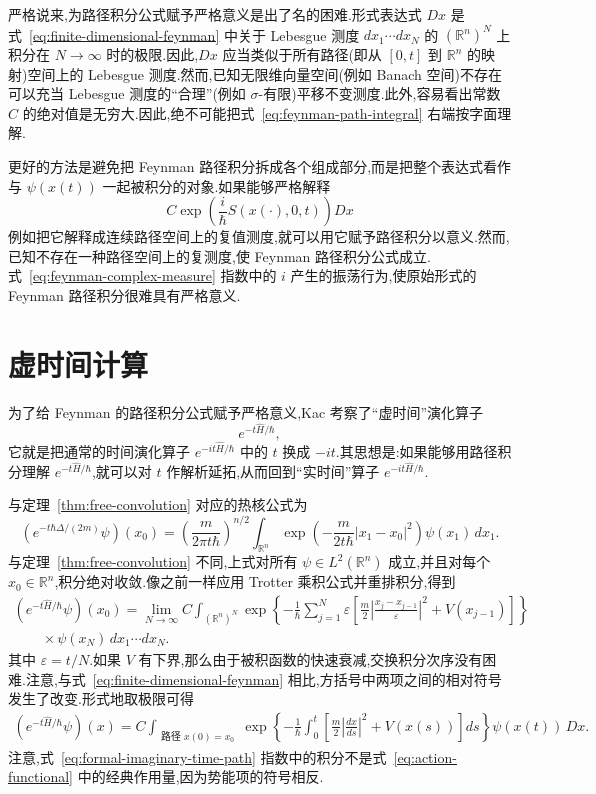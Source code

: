 严格说来,为路径积分公式赋予严格意义是出了名的困难.形式表达式 $Dx$ 是式~\eqref{eq:finite-dimensional-feynman} 中关于 Lebesgue 测度 $dx_1\cdots dx_N$ 的 $(\mathbb R^n)^N$ 上积分在 $N\to\infty$ 时的极限.因此,$Dx$ 应当类似于所有路径(即从 $[0,t]$ 到 $\mathbb R^n$ 的映射)空间上的 Lebesgue 测度.然而,已知无限维向量空间(例如 Banach 空间)不存在可以充当 Lebesgue 测度的“合理”(例如 $\sigma$-有限)平移不变测度.此外,容易看出常数 $C$ 的绝对值是无穷大.因此,绝不可能把式~\eqref{eq:feynman-path-integral} 右端按字面理解.

更好的方法是避免把 Feynman 路径积分拆成各个组成部分,而是把整个表达式看作与 $\psi(x(t))$ 一起被积分的对象.如果能够严格解释
\[
 C\exp\left(\frac{i}{\hbar}S(x(\cdot),0,t)\right)Dx\label{eq:feynman-complex-measure}
\]
例如把它解释成连续路径空间上的复值测度,就可以用它赋予路径积分以意义.然而,已知不存在一种路径空间上的复测度,使 Feynman 路径积分公式成立.式~\eqref{eq:feynman-complex-measure} 指数中的 $i$ 产生的振荡行为,使原始形式的 Feynman 路径积分很难具有严格意义.

\section{虚时间计算}
\label{sec:imaginary-time}

为了给 Feynman 的路径积分公式赋予严格意义,Kac 考察了“虚时间”演化算子
\[
 e^{-t\widehat H/\hbar},
\]
它就是把通常的时间演化算子 $e^{-it\widehat H/\hbar}$ 中的 $t$ 换成 $-it$.其思想是:如果能够用路径积分理解 $e^{-t\widehat H/\hbar}$,就可以对 $t$ 作解析延拓,从而回到“实时间”算子 $e^{-it\widehat H/\hbar}$.

与定理~\ref{thm:free-convolution} 对应的热核公式为
\[
 (e^{-t\hbar\Delta/(2m)}\psi)(x_0)
 =\left(\frac{m}{2\pi t\hbar}\right)^{n/2}
 \int_{\mathbb R^n}
 \exp\left(-\frac{m}{2t\hbar}|x_1-x_0|^2\right)
 \psi(x_1)\,dx_1.\label{eq:heat-kernel-free}
\]
与定理~\ref{thm:free-convolution} 不同,上式对所有 $\psi\in L^2(\mathbb R^n)$ 成立,并且对每个 $x_0\in\mathbb R^n$,积分绝对收敛.像之前一样应用 Trotter 乘积公式并重排积分,得到
\[
\begin{aligned}
 (e^{-t\widehat H/\hbar}\psi)(x_0)
 =\lim_{N\to\infty}C\int_{(\mathbb R^n)^N}
 \exp\left\{-\frac1\hbar\sum_{j=1}^N\varepsilon
 \left[\frac m2\left|\frac{x_j-x_{j-1}}{\varepsilon}\right|^2
 +V(x_{j-1})\right]\right\}\\
 \qquad\times\psi(x_N)\,dx_1\cdots dx_N.\label{eq:finite-dimensional-imaginary-time}
\end{aligned}
\]
其中 $\varepsilon=t/N$.如果 $V$ 有下界,那么由于被积函数的快速衰减,交换积分次序没有困难.注意,与式~\eqref{eq:finite-dimensional-feynman} 相比,方括号中两项之间的相对符号发生了改变.形式地取极限可得
\[
\begin{aligned}
 (e^{-t\widehat H/\hbar}\psi)(x)
 =C\int_{\substack{\text{路径 }x(0)=x_0}}
 \exp\left\{-\frac1\hbar\int_0^t
 \left[\frac m2\left|\frac{dx}{ds}\right|^2+V(x(s))\right]ds\right\}
 \psi(x(t))\,Dx.\label{eq:formal-imaginary-time-path}
\end{aligned}
\]
注意,式~\eqref{eq:formal-imaginary-time-path} 指数中的积分不是式~\eqref{eq:action-functional} 中的经典作用量,因为势能项的符号相反.

